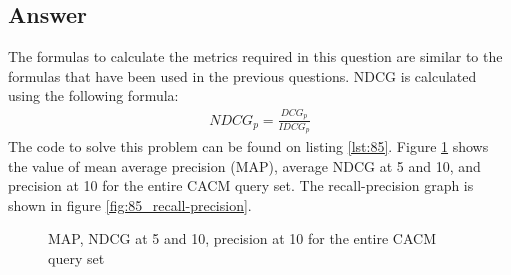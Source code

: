 \documentclass[letterpaper,11pt]{article}
\begin{document}
\subsection*{Answer}
The formulas to calculate the metrics required in this question are similar to the formulas that have been used in the previous questions. NDCG is calculated using the following formula:
\begin{align}
NDCG_{p}=\frac{DCG_{p}}{IDCG_{p}}
\end{align}
The code to solve this problem can be found on listing \ref{lst:85}. Figure \ref{fig:85_metrics} shows the value of mean average precision (MAP), average NDCG at 5 and 10, and precision at 10 for the entire CACM query set. The recall-precision graph is shown in figure \ref{fig:85_recall-precision}.

\begin{figure}[H]
	\centering
	\caption{MAP, NDCG at 5 and 10, precision at 10 for the entire CACM query set}
	\label{fig:85_metrics}
\end{figure}
\end{document}
